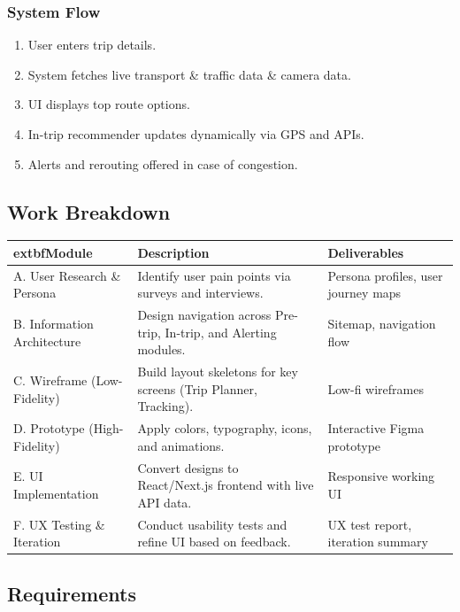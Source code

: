 \subsubsection{System Flow}
\begin{enumerate}
  \item User enters trip details.
  \item System fetches live transport \& traffic data \& camera data.
  \item UI displays top route options.
  \item In-trip recommender updates dynamically via GPS and APIs.
  \item Alerts and rerouting offered in case of congestion.
\end{enumerate}

\subsection{Work Breakdown}
\renewcommand{\arraystretch}{1.12}
\begin{tabularx}{\textwidth}{|>{\raggedright\arraybackslash}p{3.3cm}|>{\raggedright\arraybackslash}X|>{\raggedright\arraybackslash}p{3.6cm}|}
\hline
	extbf{Module} & \textbf{Description} & \textbf{Deliverables} \\
\hline
A. User Research \& Persona & Identify user pain points via surveys and interviews. & Persona profiles, user journey maps \\
\hline
B. Information Architecture & Design navigation across Pre-trip, In-trip, and Alerting modules. & Sitemap, navigation flow \\
\hline
C. Wireframe (Low-Fidelity) & Build layout skeletons for key screens (Trip Planner, Tracking). & Low-fi wireframes \\
\hline
D. Prototype (High-Fidelity) & Apply colors, typography, icons, and animations. & Interactive Figma prototype \\
\hline
E. UI Implementation & Convert designs to React/Next.js frontend with live API data. & Responsive working UI \\
\hline
F. UX Testing \& Iteration & Conduct usability tests and refine UI based on feedback. & UX test report, iteration summary \\
\hline
\end{tabularx}

\subsection{Requirements}
